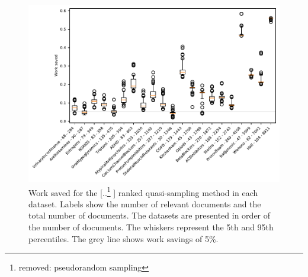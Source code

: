 \documentclass{bmcart}
\providecommand{\DIFadd}[1]{{\protect\color{blue} \sf #1}} %
\providecommand{\DIFdel}[1]{{\protect\color{red} [..\footnote{removed: #1} ]}} %
\providecommand{\DIFaddFL}[1]{\DIFadd{#1}} %
\providecommand{\DIFdelFL}[1]{\DIFdel{#1}} %
\providecommand{\DIFaddbeginFL}{} %
\providecommand{\DIFaddendFL}{} %
\providecommand{\DIFdelbeginFL}{} %
\providecommand{\DIFdelendFL}{} %
\newcommand{\DIFscaledelfig}{0.5}
\newlength{\DIFdelgraphicswidth} %
\newlength{\DIFdelgraphicsheight} %
\newcommand{\DIFaddincludegraphics}[2][]{{\color{blue}\fbox{\DIFOincludegraphics[#1]{#2}}}} %
\newcommand{\DIFdelincludegraphics}[2][]{%
\sbox{\DIFdelgraphicsbox}{\DIFOincludegraphics[#1]{#2}}%
\settoboxwidth{\DIFdelgraphicswidth}{\DIFdelgraphicsbox} %
\settoboxtotalheight{\DIFdelgraphicsheight}{\DIFdelgraphicsbox} %
\scalebox{\DIFscaledelfig}{%
\parbox[b]{\DIFdelgraphicswidth}{\usebox{\DIFdelgraphicsbox}\\[-\baselineskip] \rule{\DIFdelgraphicswidth}{0em}}\llap{\resizebox{\DIFdelgraphicswidth}{\DIFdelgraphicsheight}{%
\setlength{\unitlength}{\DIFdelgraphicswidth}%
\begin{picture}(1,1)%
\thicklines\linethickness{2pt} %
{\color[rgb]{1,0,0}\put(0,0){\framebox(1,1){}}}%
{\color[rgb]{1,0,0}\put(0,0){\line( 1,1){1}}}%
{\color[rgb]{1,0,0}\put(0,1){\line(1,-1){1}}}%
\end{picture}%
}\hspace*{3pt}}} %
} %
\DeclareRobustCommand{\DIFaddbeginFL}{\DIFOaddbeginFL \let\includegraphics\DIFaddincludegraphics} %
\DeclareRobustCommand{\DIFaddendFL}{\DIFOaddendFL \let\includegraphics\DIFOincludegraphics} %
\DeclareRobustCommand{\DIFdelbeginFL}{\DIFOdelbeginFL \let\includegraphics\DIFdelincludegraphics} %
\DeclareRobustCommand{\DIFdelendFL}{\DIFOaddendFL \let\includegraphics\DIFOincludegraphics} %
\begin{document}
	\begin{figure}
		\DIFdelbeginFL %
\DIFdelendFL \DIFaddbeginFL \includegraphics[width=0.9\linewidth]{2_figs_wss_nrs.pdf}
		\DIFaddendFL \caption{Work saved for the \DIFdelbeginFL \DIFdelFL{pseudorandom sampling }\DIFdelendFL \DIFaddbeginFL \DIFaddFL{ranked quasi-sampling }\DIFaddendFL method in each dataset. Labels show the number of relevant documents and the total number of documents. The datasets are presented in order of the number of documents. The whiskers represent the 5th and 95th percentiles. The grey line shows work savings of 5\%. }
		\label{wss}
	\end{figure}
\end{document}
